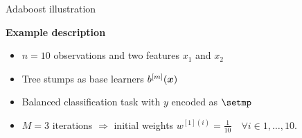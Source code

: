\begin{vbframe}{Adaboost illustration}
\begin{footnotesize}

\textbf{Example description}

\begin{itemize}
  \item $n = 10$ observations and two features $x_1$ and $x_2$ 
  \item Tree stumps as base learners $b^{[m]}(\bm{x})$
  \item Balanced classification task with $y$ encoded as $\setmp$
  \item $M = 3$ iterations $\Rightarrow$ initial weights 
  $w^{[1](i)} = \frac{1}{10} \quad \forall i \in 1,\dots ,10$. 
\end{itemize}

\vfill


\end{footnotesize}
\end{vbframe}
